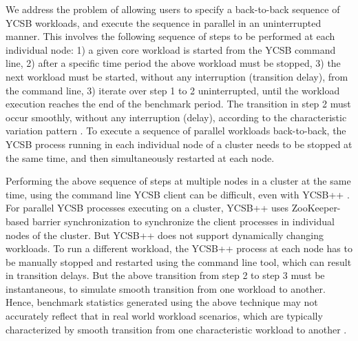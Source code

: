 \documentclass[conference]{IEEEtran}
\begin{document}
           \par We address the problem of allowing users to specify a back-to-back sequence of YCSB workloads, and execute the sequence in parallel in an uninterrupted manner. This involves the following sequence of steps to be performed at each individual node: 1) a given core workload is started from the YCSB command line, 2) after a specific time period the above workload must be stopped, 3) the next workload must be started, without any interruption (transition delay), from the command line, 3) iterate over step 1 to 2 uninterrupted, until the workload execution reaches the end of the benchmark period. The transition in step 2 must occur smoothly, without any interruption (delay), according to the characteristic variation pattern \cite{NetflixWorkload-Variation}. To execute a sequence of parallel workloads back-to-back, the YCSB process running in each individual node of a cluster needs to be stopped at the same time, and then simultaneously restarted at each node.
            \par  Performing the above sequence of steps at multiple nodes in a cluster at the same time, using the command line YCSB client can be difficult, even with YCSB++ \cite{Patil:2011:YBP:2038916.2038925}.
            For parallel YCSB processes executing on a cluster, YCSB++ uses ZooKeeper-based barrier synchronization to synchronize the client processes in individual nodes of the cluster.
            But YCSB++ does not support dynamically changing workloads. To run a different workload,
            the YCSB++ process at each node has to be manually stopped and restarted
            using the command line tool, which can result in transition delays.
             But the above transition from step 2 to step 3 must be instantaneous, to simulate smooth transition from one  workload to another.
               Hence, benchmark statistics generated using the above
              technique may not accurately reflect that in real world workload scenarios, which are typically characterized by smooth transition from one
               characteristic workload to another \cite{NetflixWorkload-Variation}. %
\end{document}
